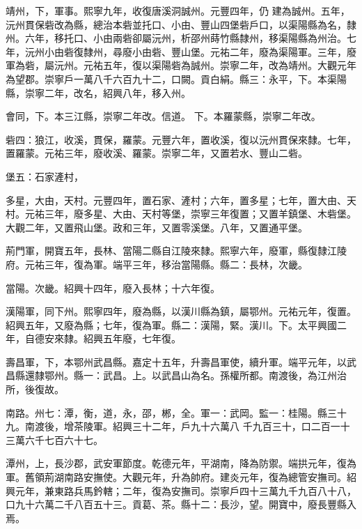 \begin{pinyinscope}
 靖州，下，軍事。熙寧九年，收復唐溪洞誠州。元豐四年，仍
 建為誠州。五年，沅州貫保砦改為縣，總治本砦並托口、小由、豐山四堡砦戶口，以渠陽縣為名，隸州。六年，移托口、小由兩砦卻屬沅州，析邵州蒔竹縣隸州，移渠陽縣為州治。七年，沅州小由砦復隸州，尋廢小由砦、豐山堡。元祐二年，廢為渠陽軍。三年，廢軍為砦，屬沅州。元祐五年，復以渠陽砦為誠州。崇寧二年，改為靖州。大觀元年為望郡。崇寧戶一萬八千六百九十二，口闕。貢白絹。縣三：永平，下。本渠陽縣，崇寧二年，改名，紹興八年，移入州。



 會同，下。本三江縣，崇寧二年改。信道。
 下。本羅蒙縣，崇寧二年改。



 砦四：狼江，收溪，貫保，羅蒙。元豐六年，置收溪，復以沅州貫保來隸。七年，置羅蒙。元祐三年，廢收溪、羅蒙。崇寧二年，又置若水、豐山二砦。



 堡五：石家滻村，



 多星，大由，天村。元豐四年，置石家、滻村；六年，置多星；七年，置大由、天村。元祐三年，廢多星、大由、天村等堡，崇寧三年復置；又置羊鎮堡、木砦堡。大觀二年，又置飛山堡。政和三年，又置零溪堡。八年，又置通平堡。



 荊門軍，開寶五年，長林、當陽二縣自江陵來隸。熙寧六年，廢軍，縣復隸江陵府。元祐三年，復為軍。端平三年，移治當陽縣。縣二：長林，次畿。



 當陽。次畿。紹興十四年，廢入長林；十六年復。



 漢陽軍，同下州。熙寧四年，廢為縣，以漢川縣為鎮，屬鄂州。元祐元年，復置。紹興五年，又廢為縣；七年，復為軍。縣二：漢陽，緊。漢川。下。太平興國二年，自德安來隸。紹興五年廢，七年復。



 壽昌軍，下，本鄂州武昌縣。嘉定十五年，升壽昌軍使，續升軍。端平元年，以武昌縣還隸鄂州。縣一：武昌。上。以武昌山為名。孫權所都。南渡後，為江州治所，後復故。



 南路。州七：潭，衡，道，永，邵，郴，全。軍一：武岡。監一：桂陽。縣三十九。南渡後，增茶陵軍。紹興三十二年，戶九十六萬八
 千九百三十，口二百一十三萬六千七百六十七。



 潭州，上，長沙郡，武安軍節度。乾德元年，平湖南，降為防禦。端拱元年，復為軍。舊領荊湖南路安撫使。大觀元年，升為帥府。建炎元年，復為總管安撫司。紹興元年，兼東路兵馬鈐轄；二年，復為安撫司。崇寧戶四十三萬九千九百八十八，口九十六萬二千八百五十三。貢葛、茶。縣十二：長沙，望。開寶中，廢長豐縣入焉。




\end{pinyinscope}
